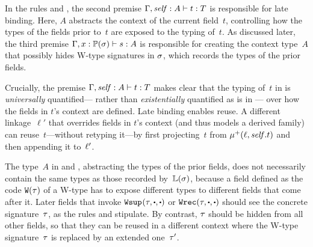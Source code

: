 In the rules  and ,
the second premise $ {\Gamma, \mathit{self} : A} \vdash {t} : {T} $ is
responsible for late binding.
Here, $A$ abstracts the context of the current field~$t$, controlling
how the types of the fields prior to~$t$ are exposed to the typing of~$t$.
%
As discussed later, the third premise $ {\Gamma,x : \mathbb{P}({\sigma})} \vdash {\ensuremath{s}} : {A} $
is responsible for creating the context type~$A$ that possibly hides W-type
signatures in $\sigma$, which records the types of the prior fields.

Crucially, %
the premise $ {\Gamma, \mathit{self} : A} \vdash {t} : {T} $ makes clear that
the typing of~$t$ in  is \emph{universally} quantified---%
rather than \emph{existentially} quantified as is in ---%
over how the fields in $t$'s context are defined.
Late binding enables reuse.
A different linkage~$\ell'$ that overrides fields in $t$'s context (and thus models a derived family)
can reuse~$t$---without retyping it---by first
projecting~$t$ from $\mu^+({\ell},{\mathit{self}.t})$ and then appending it to~$\ell'$.

The type~$A$ in  and ,
abstracting the types of the prior fields, does not necessarily contain the same types as those recorded by~$\mathbb{L}({\sigma})$,
because a field defined as the code $\texttt{W}({\tau})$ of a W-type has to
expose different types to different fields that come after it.
Later fields that invoke
$\Wsup{}{\wsig}{\cDot}{\cDot}$ or $\Wrec{\wsig}{\cDot}{\cDot}$
should see the concrete signature~$\tau$, as the rules 
and  stipulate.
By contrast, $\tau$ should be hidden
from all other fields, so that they can be reused
in a different context where the W-type signature~$\tau$ is replaced by an extended one~$\tau'$.





